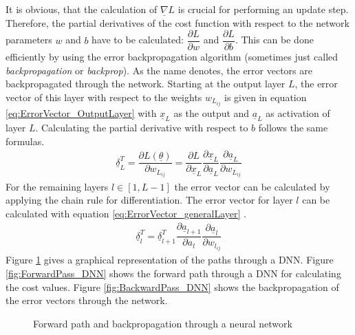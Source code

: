 \documentclass[12pt,DIV14,BCOR12mm,a4paper,footexclude,headinclude,halfparskip-,twoside,openright,cleardoubleempty,idxtotoc,bibtotoc,listtotoc,abstracton]{scrreprt} %
\numberwithin{equation}{chapter}
\begin{document}
It is obvious, that the calculation of $\underline{\nabla}L$ is crucial for performing an update step. Therefore, the partial derivatives of the cost function with respect to the network parameters $w$ and $b$ have to be calculated: $\dfrac{\partial L}{\partial w}$ and $\dfrac{\partial L}{\partial b}$. This can be done efficiently by using the error backpropagation algorithm (sometimes just called \textit{backpropagation} or \textit{backprop}). As the name denotes, the error vectors are backpropagated through the network. Starting at the output layer $L$, the  error vector of this layer with respect to the weights $w_{L_{ij}}$ is given in equation \ref{eq:ErrorVector_OutputLayer} with $\underline{x}_{L}$ as the output and $\underline{a}_{L}$ as activation of layer $L$. Calculating the partial derivative with respect to $b$ follows the same formulas.
\begin{align}
	\underline{\delta}_{L}^{T} = \dfrac{\partial L(\underline{\theta})}{\partial w_{L_{ij}}} = \dfrac{\partial L}{\partial \underline{x}_{L}}\dfrac{\partial \underline{x}_{L}}{\partial \underline{a}_{L}}\dfrac{\partial \underline{a}_{L}}{\partial w_{L_{ij}}}\label{eq:ErrorVector_OutputLayer}
\end{align}
For the remaining layers $l \in [1, L-1]$ the error vector can be calculated by applying the chain rule for differentiation. The error vector for layer $l$ can be calculated with equation \ref{eq:ErrorVector_generalLayer} \cite{LectureNotes_DeepLearning}.
\begin{align}
	\underline{\delta}_{l}^{T} = \underline{\delta}_{l+1}^{T}\dfrac{\partial \underline{a}_{l+1}}{\partial a_{l}}\dfrac{\partial \underline{a}_{l}}{\partial w_{l_{ij}}}\label{eq:ErrorVector_generalLayer}
\end{align}
Figure \ref{fig:Backprop_DNN} gives a graphical representation of the paths through a DNN. Figure \ref{fig:ForwardPass_DNN} shows the forward path through a DNN for calculating the cost values. Figure \ref{fig:BackwardPass_DNN} shows the backpropagation of the error vectors through the network.
\begin{figure}[htb!]
	\centering
	\qquad
	\caption{Forward path and backpropagation through a neural network}
	\label{fig:Backprop_DNN}
\end{figure}
\end{document}

